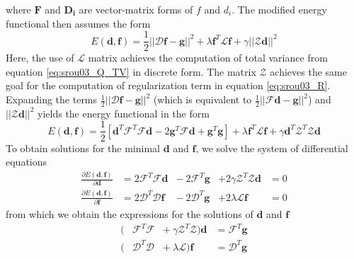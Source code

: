 \documentclass[12pt,notitlepage]{report}
\begin{document}
where $\mathbf{F}$ and $\mathbf{D_i}$ are vector-matrix forms of $f$ and $d_i$. The modified energy functional then assumes the form
\begin{equation}
\label{eq:srou03_energy_vec}
	E(\mathbf{d},\mathbf{f}) = \frac{1}{2}||\mathcal{D}\mathbf{f} - \mathbf{g}||^2 + \lambda  \mathbf{f}^T \mathcal{L} \mathbf{f} + \gamma ||\mathcal{Z} \mathbf{d}||^2 	
\end{equation}
Here, the use of $\mathcal{L}$ matrix achieves the computation of total variance from equation \ref{eq:srou03_Q_TV} in discrete form. The matrix $\mathcal{Z}$ achieves the same goal for the computation of regularization term in equation \ref{eq:srou03_R}. 
Expanding the terms $\frac{1}{2}||\mathcal{D}\mathbf{f} - \mathbf{g}||^2$ (which is equivalent to $\frac{1}{2}||\mathcal{F}\mathbf{d} - \mathbf{g}||^2$) and $||\mathcal{Z} \mathbf{d}||^2$ yields the energy functional in the form
\begin{equation}
\label{eq:srou03_energy_vec_exp}
	E(\mathbf{d},\mathbf{f}) = \frac{1}{2}[\mathbf{d}^T \mathcal{F}^T \mathcal{F} \mathbf{d}  - 2 \mathbf{g}^T \mathcal{F} \mathbf{d} + \mathbf{g}^T \mathbf{g}] + \lambda \mathbf{f}^T \mathcal{L} \mathbf{f} + \gamma \mathbf{d}^T \mathcal{Z}^T \mathcal{Z} \mathbf{d}	
\end{equation}
To obtain solutions for the minimal $\mathbf{d}$ and $\mathbf{f}$, we solve the system of differential equations
\begin{equation}
\label{eq:srou03_energy_vec_partial}
	\begin{aligned}
		\frac{\partial E(\mathbf{d},\mathbf{f})}{\partial \mathbf{d}} &= 2 \mathcal{F}^T \mathcal{F} \mathbf{d} &- \ 2 \mathcal{F}^T \mathbf{g} &+ 2 \gamma \mathcal{Z}^T \mathcal{Z} \mathbf{d} &= 0 \\	
		\frac{\partial E(\mathbf{d},\mathbf{f})}{\partial \mathbf{f}} &= 2 \mathcal{D}^T \mathcal{D} \mathbf{f} &- \ 2 \mathcal{D}^T \mathbf{g} &+ 2 \lambda              \mathcal{L} \mathbf{f} &= 0
	\end{aligned}
\end{equation}
from which we obtain the expressions for the solutions of $\mathbf{d}$ and $\mathbf{f}$
\begin{equation}
\label{eq:srou03_solutions}
	\begin{aligned}
		( &\mathcal{F}^T \mathcal{F} &+ \ \gamma \mathcal{Z}^T \mathcal{Z} ) \mathbf{d} &= \mathcal{F}^T \mathbf{g} \\
		( &\mathcal{D}^T \mathcal{D} &+ \ \lambda              \mathcal{L} ) \mathbf{f} &= \mathcal{D}^T \mathbf{g}	
	\end{aligned}
\end{equation}
\end{document}
